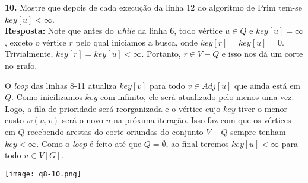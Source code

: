 
\noindent\textbf{10.} Mostre que depois de cada execução da linha 12 do algoritmo de Prim tem-se $key[u] < \infty$.\\[6pt]
\textbf{Resposta:} Note que antes do \textit{while} da linha 6, todo vértice $u \in Q$ e $key[u] = \infty$, exceto o vértice $r$ pelo qual iniciamos a busca, onde $key[r] = key[u] = 0$. Trivialmente, $key[r] = key[u] < \infty$. Portanto, $r \in V-Q$ e isso nos dá um corte no grafo.

O \textit{loop} das linhas 8-11 atualiza $key[v]$ para todo $v \in Adj[u]$ que ainda está em $Q$. Como inicilizamos $key$ com infinito, ele será atualizado pelo menos uma vez. Logo, a fila de prioridade será reorganizada e o vértice cujo $key$ tiver o menor custo $w(u, v)$ será o novo $u$ na próxima iteração. Isso faz com que os vértices em $Q$ recebendo arestas do corte oriundas do conjunto $V - Q$ sempre tenham $key < \infty$. Como o \textit{loop} é feito até que $Q = \emptyset$, ao final teremos $key[u] < \infty$ para todo $u \in V[G]$.

\begin{center}
\texttt{[image: q8-10.png]}
\label{fig:8.10-1}
\end{center}
